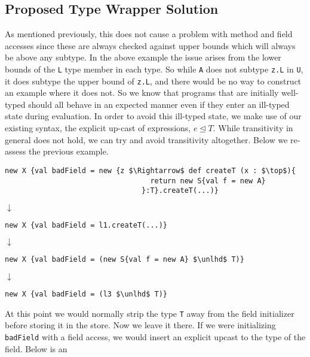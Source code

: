 \documentclass{llncs}
\numberwithin{subcase}{casethm}
\numberwithin{casethm}{theorem}
\numberwithin{casethm}{lemma}
\begin{document}
\subsection{Proposed Type Wrapper Solution}
As mentioned previously, this does not cause 
a problem with method and field accesses since 
these are always checked against upper bounds which 
will always be above any subtype. In the above 
example the issue arises from the lower bounds 
of the \texttt{L} type member in each type. So 
while \texttt{A} does not subtype \texttt{z.L} 
in \texttt{U}, it does subtype the upper bound of
\texttt{z.L}, and there would be no way to construct 
an example where it does not. So we know that 
programs that are initially well-typed should all 
behave in an expected manner even if they enter 
an ill-typed state during evaluation. In order 
to avoid this ill-typed state, we make use of our
existing syntax, the explicit up-cast of expressions, 
$e \unlhd T$. While transitivity in general does not 
hold, we can try and avoid transitivity altogether.
Below we re-assess the previous example.
\begin{lstlisting}[mathescape, style=custom_lang]
new X {val badField = new {z $\Rightarrow$ def createT (x : $\top$){
                                  return new S{val f = new A}
                                }:T}.createT(...)}
\end{lstlisting}
\begin{center}$\downarrow$\end{center}
\begin{lstlisting}[mathescape, style=custom_lang]
new X {val badField = l1.createT(...)}
\end{lstlisting}
\begin{center}$\downarrow$\end{center}
\begin{lstlisting}[mathescape, style=custom_lang]
new X {val badField = (new S{val f = new A} $\unlhd$ T)}
\end{lstlisting}
\begin{center}$\downarrow$\end{center}
\begin{lstlisting}[mathescape, style=custom_lang]
new X {val badField = (l3 $\unlhd$ T)}
\end{lstlisting}
At this point we would normally strip the type 
\texttt{T} away from the field initializer before 
storing it in the store. Now we leave it there. 
If we were initializing \texttt{badField} with 
a field access, we would insert an explicit 
upcast to the type of the field. Below is an 
\end{document}
